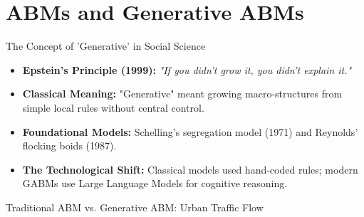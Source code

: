 \documentclass{beamer}
\begin{document}
\section{ABMs and Generative ABMs}

\begin{frame}{The Concept of 'Generative' in Social Science}
\begin{itemize}
    \item \textbf{Epstein's Principle (1999):} \textit{"If you didn't grow it, you didn't explain it."}
    \medskip
    \item \textbf{Classical Meaning:} "Generative" meant growing macro-structures from simple local rules without central control.
    \medskip
    \item \textbf{Foundational Models:} Schelling's segregation model (1971) and Reynolds' flocking boids (1987).
    \medskip
    \item \textbf{The Technological Shift:} Classical models used hand-coded rules; modern GABMs use Large Language Models for cognitive reasoning.
\end{itemize}
\end{frame}

\begin{frame}[t]{Traditional ABM vs. Generative ABM: Urban Traffic Flow}
\vspace{-0.1cm}
\begin{table}[t]
\centering
\caption{\small Comparison between Traditional ABM and Generative ABM (Table I)}
\vspace{-0.2cm}
\setlength{\arrayrulewidth}{0.9pt}
\renewcommand{\arraystretch}{1.4}
\end{table}
\end{frame}
\end{document}
